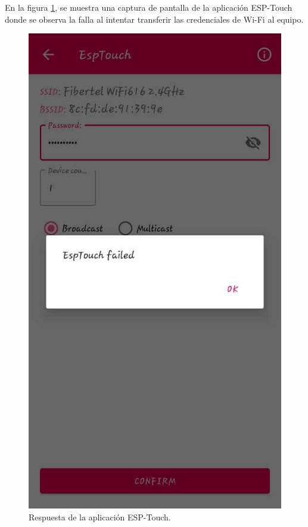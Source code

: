 En la figura \ref{fig:pruIni_2_ESPT}, se muestra una captura de pantalla de la aplicación ESP-Touch donde se observa la falla al intentar transferir las credenciales de Wi-Fi al equipo.

\begin{figure}[htpb]
	\centering
	\includegraphics[scale=0.4]{./Figures/ESP_Touch_fail.jpeg}
	\caption{Respuesta de la aplicación ESP-Touch.}
	\label{fig:pruIni_2_ESPT}
\end{figure}

